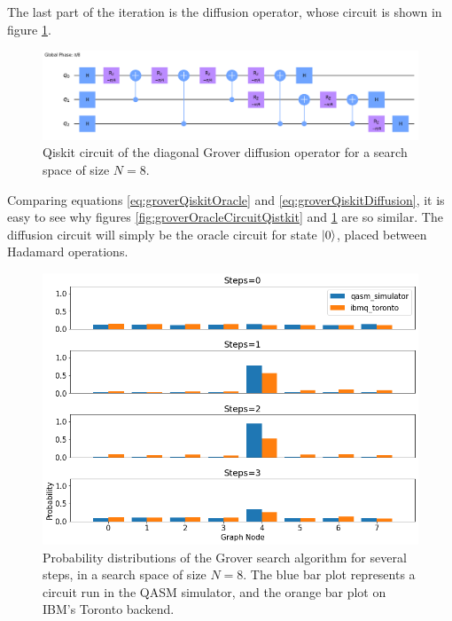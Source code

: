 \documentclass[../../dissertation.tex]{subfiles}
\begin{document}
The last part of the iteration is the diffusion operator, whose circuit is
shown in figure \ref{fig:groverDiffCircuitQistkit}.
\begin{figure}[!h]
	\centering
	\includegraphics[scale=0.25]{img/Qiskit/GroverQiskit/Circuits/GroverQiskitCircDiff_N3_M4_S3.png}
	\caption{Qiskit circuit of the  diagonal Grover diffusion operator for a search space of size $N=8$.}
	\label{fig:groverDiffCircuitQistkit}
\end{figure}
Comparing equations \eqref{eq:groverQiskitOracle} and
\eqref{eq:groverQiskitDiffusion}, it is easy to see why figures
\ref{fig:groverOracleCircuitQistkit} and \ref{fig:groverDiffCircuitQistkit} are
so similar. The diffusion circuit will simply be the oracle circuit for state
$\ket{0}$, placed between Hadamard operations.
\begin{figure}[!h]
	\centering
	\includegraphics[scale=0.40]{img/Qiskit/GroverQiskit/GroverQiskitSearch_N3_M4_S0123}
	\caption{Probability distributions of the Grover search algorithm for several steps, in a search space of size $N=8$. The blue bar plot represents a circuit run in the QASM simulator, and the orange bar plot on IBM's Toronto backend.}
	\label{fig:groverQiskitDist}
\end{figure}\par
\end{document}
